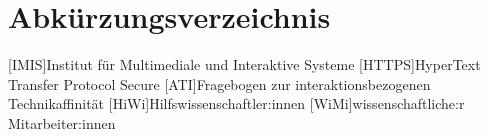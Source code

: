 
\cleardoublepage
{}
{}
\chapter*{Abkürzungsverzeichnis}
\label{section-abbrevs}


\begin{acronym}[CoLab]
  [IMIS]{Institut für Multimediale und Interaktive Systeme}
  [HTTPS]{HyperText Transfer Protocol Secure}
  [ATI]{Fragebogen zur interaktionsbezogenen Technikaffinität}
  [HiWi]{Hilfswissenschaftler:innen}
  [WiMi]{wissenschaftliche:r Mitarbeiter:innen}
\end{acronym}

